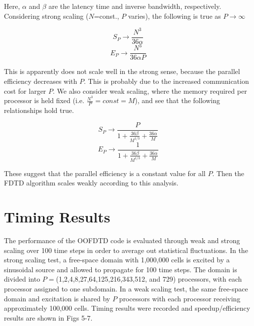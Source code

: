\documentclass{article}
\begin{document}
Here, $\alpha$ and $\beta$ are the latency time and inverse bandwidth, respectively. Considering strong scaling ($N$=const., $P$ varies), the following is true as $P\rightarrow \infty$

$$S_P \rightarrow \frac{N^3}{36\alpha}$$
$$E_P \rightarrow \frac{N^3}{36\alpha P}$$

This is apparently does not scale well in the strong sense, because the parallel efficiency decreases with $P$. This is probably due to the increased communication cost for larger $P$. We also consider weak scaling, where the memory required per processor is held fixed (i.e. $\frac{N^3}{P}= const = M$), and see that the following relationships hold true.

$$S_P \rightarrow \frac{P}{1 + \frac{36\beta}{M^{1/3}} + \frac{36\alpha}{M}}$$
$$E_P \rightarrow \frac{1}{1 + \frac{36\beta}{M^{1/3}} + \frac{36\alpha}{M}}$$

These suggest that the parallel efficiency is a constant value for all $P$. Then the FDTD algorithm scales weakly according to this analysis. 

\section{Timing Results}

The performance of the OOFDTD code is evaluated through weak and strong scaling over 100 time steps in order to average out statistical fluctuations. In the strong scaling test, a free-space domain with 1,000,000 cells is excited by a sinusoidal source and allowed to propagate for 100 time steps. The domain is divided into $P=$(1,2,4,8,27,64,125,216,343,512, and 729) processors, with each processor assigned to one subdomain. In a weak scaling test, the same free-space domain and excitation is shared by $P$ processors with each processor receiving approximately 100,000 cells. Timing results were recorded and speedup/efficiency results are shown in Figs 5-7.
\end{document}
